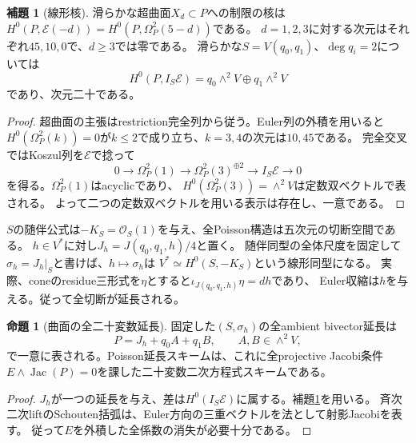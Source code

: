 \documentclass[a4paper,11pt]{ltjsarticle}
\theoremstyle{definition}
\newtheorem{proposition}[theorem]{命題}
\newtheorem{lemma}[theorem]{補題}
\theoremstyle{definition}\newtheorem{definition}[theorem]{定義}
\theoremstyle{remark}\newtheorem{remark}[theorem]{注意}
\newcommand{\cO}{\mathcal O}\newcommand{\cE}{\mathcal E}\newcommand{\Pf}{\operatorname{Pf}}
\newcommand{\Jac}{\operatorname{Jac}}
\begin{document}
\begin{lemma}[線形核]\label{lem:kernel}
滑らかな超曲面$X_d\subset P$への制限の核は
$H^0(P,\cE(-d))=H^0(P,\Omega_P^2(5-d))$である。
$d=1,2,3$に対する次元はそれぞれ$45,10,0$で、$d\ge3$では零である。
滑らかな$S=V(q_0,q_1)$、$\deg q_i=2$については
\[
 H^0(P,I_S\cE)=q_0\wedge^2V\oplus q_1\wedge^2V
\]
であり、次元二十である。
\end{lemma}
\begin{proof}
超曲面の主張はrestriction完全列から従う。Euler列の外積を用いると
$H^0(\Omega_P^2(k))=0$が$k\le2$で成り立ち、$k=3,4$の次元は$10,45$である。
完全交叉ではKoszul列を$\cE$で捻って
\[
0\longrightarrow\Omega_P^2(1)\longrightarrow
\Omega_P^2(3)^{\oplus2}\longrightarrow I_S\cE\longrightarrow0
\]
を得る。$\Omega_P^2(1)$はacyclicであり、
$H^0(\Omega_P^2(3))=\wedge^2V$は定数双ベクトルで表される。
よって二つの定数双ベクトルを用いる表示は存在し、一意である。
\end{proof}

$S$の随伴公式は$-K_S=\cO_S(1)$を与え、全Poisson構造は五次元の切断空間である。
$h\in V^*$に対し$J_h=J(q_0,q_1,h)/4$と置く。
随伴同型の全体尺度を固定して$\sigma_h=J_h|_S$と書けば、$h\mapsto\sigma_h$は
$V^*\simeq H^0(S,-K_S)$という線形同型になる。
実際、coneのresidue三形式を$\eta$とすると$\iota_{J(q_0,q_1,h)}\eta=dh$であり、
Euler収縮は$h$を与える。従って全切断が延長される。

\begin{proposition}[曲面の全二十変数延長]\label{prop:full20}
固定した$(S,\sigma_h)$の全ambient bivector延長は
\begin{equation}
 P=J_h+q_0A+q_1B,\qquad A,B\in\wedge^2V,               \label{eq:full20}
\end{equation}
で一意に表される。Poisson延長スキームは、これに全projective Jacobi条件
$E\wedge\Jac(P)=0$を課した二十変数二次方程式スキームである。
\end{proposition}
\begin{proof}
$J_h$が一つの延長を与え、差は$H^0(I_S\cE)$に属する。補題\ref{lem:kernel}を用いる。
斉次二次liftのSchouten括弧は、Euler方向の三重ベクトルを法として射影Jacobiを表す。
従って$E$を外積した全係数の消失が必要十分である。
\end{proof}
\end{document}
